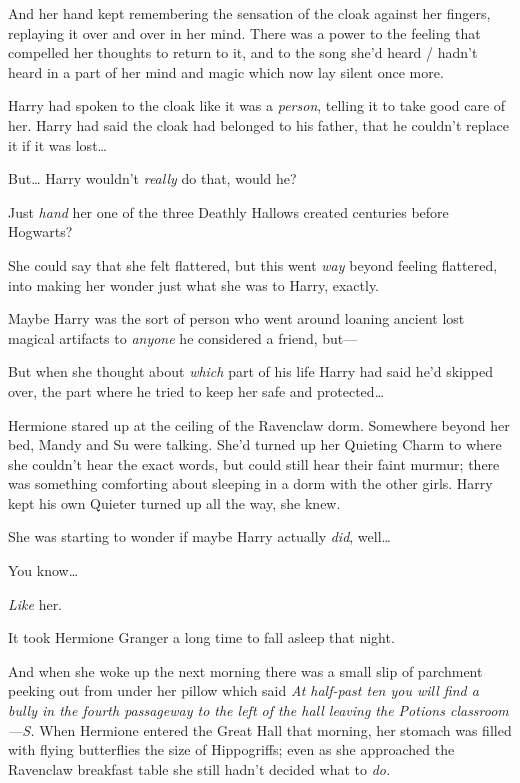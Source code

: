 And her hand kept remembering the sensation of the cloak against her fingers, 
replaying it over and over in her mind. There was a power to the feeling that 
compelled her thoughts to return to it, and to the song she'd heard / hadn't 
heard in a part of her mind and magic which now lay silent once more.

Harry had spoken to the cloak like it was a \emph{person}, telling it to take 
good care of her. Harry had said the cloak had belonged to his father, that he 
couldn't replace it if it was lost{\ldots}

But{\ldots} Harry wouldn't \emph{really} do that, would he?

Just \emph{hand} her one of the three Deathly Hallows created centuries before 
Hogwarts?

She could say that she felt flattered, but this went \emph{way} beyond feeling 
flattered, into making her wonder just what she was to Harry, exactly.

Maybe Harry was the sort of person who went around loaning ancient lost magical 
artifacts to \emph{anyone} he considered a friend, but---

But when she thought about \emph{which} part of his life Harry had said he'd 
skipped over, the part where he tried to keep her safe and protected{\ldots}

Hermione stared up at the ceiling of the Ravenclaw dorm. Somewhere beyond her 
bed, Mandy and Su were talking. She'd turned up her Quieting Charm to where she 
couldn't hear the exact words, but could still hear their faint murmur; there 
was something comforting about sleeping in a dorm with the other girls. Harry 
kept his own Quieter turned up all the way, she knew.

She was starting to wonder if maybe Harry actually \emph{did}, well{\ldots}

You know{\ldots}

\emph{Like} her.

It took Hermione Granger a long time to fall asleep that night.

And when she woke up the next morning there was a small slip of parchment 
peeking out from under her pillow which said \emph{At half-past ten you will 
find a bully in the fourth passageway to the left of the hall leaving the 
Potions classroom---S.}
\sbreak
When Hermione entered the Great Hall that morning, her stomach was filled with 
flying butterflies the size of Hippogriffs; even as she approached the 
Ravenclaw breakfast table she still hadn't decided what to \emph{do.}

